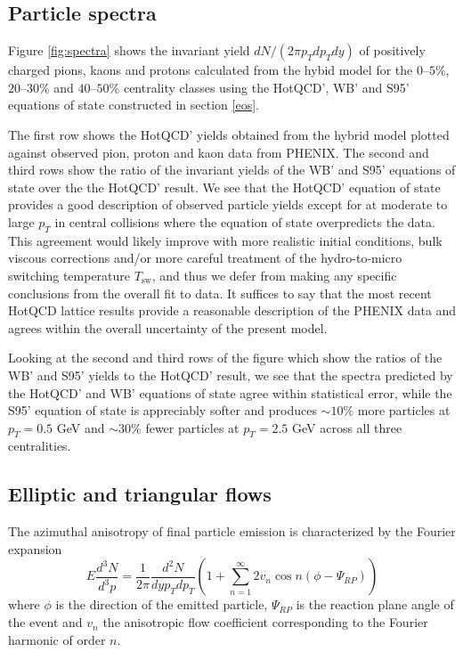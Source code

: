 \documentclass[aps,prc,reprint,amsmath,nofootinbib,superscriptaddress]{revtex4-1}
\begin{document}
\subsection{Particle spectra}
\label{spectra}

Figure \ref{fig:spectra} shows the invariant yield $dN/(2\pi p_T dp_T dy)$ of positively charged pions, kaons and protons calculated from the hybid model for the $0$--$5\%$, $20$--$30\%$
and $40$--$50\%$ centrality classes using the HotQCD', WB' and S95' equations of state constructed in section \ref{eos}. 

The first row shows the HotQCD' yields obtained from the hybrid model plotted against observed pion, proton and kaon data from PHENIX. The second and third rows show the ratio of the invariant yields of 
the WB' and S95' equations of state over the the HotQCD' result. We see that the HotQCD' equation of state provides a good description of observed particle yields except for at moderate 
to large $p_T$ in central collisions where the equation of state overpredicts the data. This agreement would likely improve with more realistic initial conditions, bulk viscous corrections 
and/or more careful treatment of the hydro-to-micro switching temperature $T_\text{sw}$, and thus we defer from making any specific conclusions from the overall fit to data. It suffices to say that the 
most recent HotQCD lattice results provide a reasonable description of the PHENIX data and agrees within the overall uncertainty of the present model. 

Looking at the second and third rows of the figure which show the ratios of the WB' and S95' yields to the HotQCD' result, we see that the spectra predicted by the HotQCD' and WB' equations of state 
agree within statistical error, while the S95' equation of state is appreciably softer and produces $\sim 10\%$ more particles at $p_T = 0.5$ GeV and $\sim 30\%$ fewer particles at $p_T=2.5$ GeV across all three centralities.

\subsection{Elliptic and triangular flows}
\label{flow}

The azimuthal anisotropy of final particle emission is characterized by the Fourier expansion
\begin{equation}
 E \frac{d^3N}{d^3p} = \frac{1}{2\pi} \frac{d^2N}{dy p_T dp_T} \left(1 + \sum\limits_{n=1}^\infty 2 v_n \cos n(\phi - \Psi_{RP}) \right)
\end{equation}
where $\phi$ is the direction of the emitted particle, $\Psi_{RP}$ is the reaction plane angle of the event and $v_n$ the anisotropic flow coefficient corresponding to the Fourier harmonic of order $n$.
\end{document}
